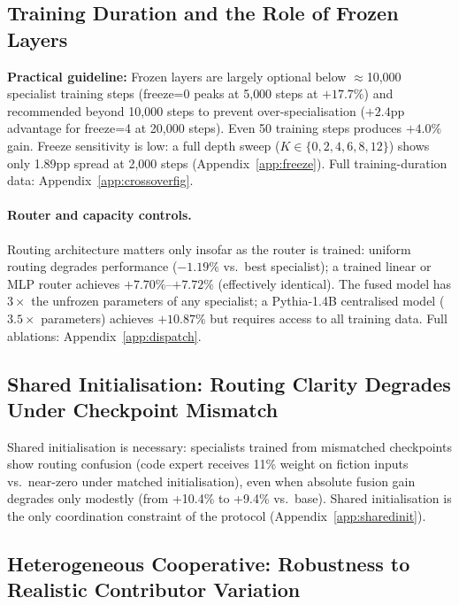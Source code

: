 \documentclass{article}
\begin{document}
\subsection{Training Duration and the Role of Frozen Layers}
\label{sec:crossover}

\textbf{Practical guideline:} Frozen layers are largely optional below $\approx$10{,}000 specialist training steps (freeze=0 peaks at 5{,}000 steps at $+17.7\%$) and recommended beyond 10{,}000 steps to prevent over-specialisation ($+2.4$pp advantage for freeze=4 at 20{,}000 steps). Even 50 training steps produces $+4.0\%$ gain. Freeze sensitivity is low: a full depth sweep ($K \in \{0,2,4,6,8,12\}$) shows only 1.89pp spread at 2{,}000 steps (Appendix~\ref{app:freeze}). Full training-duration data: Appendix~\ref{app:crossoverfig}.


\paragraph{Router and capacity controls.} Routing architecture matters only insofar as the router is trained: uniform routing degrades performance ($-1.19\%$ vs.\ best specialist); a trained linear or MLP router achieves $+7.70\%$--$+7.72\%$ (effectively identical). The fused model has $3\times$ the unfrozen parameters of any specialist; a Pythia-1.4B centralised model ($3.5\times$ parameters) achieves $+10.87\%$ but requires access to all training data. Full ablations: Appendix~\ref{app:dispatch}.

\subsection{Shared Initialisation: Routing Clarity Degrades Under Checkpoint Mismatch}
\label{sec:sharedinit}

Shared initialisation is necessary: specialists trained from mismatched checkpoints show routing confusion (code expert receives 11\% weight on fiction inputs vs.\ near-zero under matched initialisation), even when absolute fusion gain degrades only modestly (from +10.4\% to +9.4\% vs.\ base). Shared initialisation is the only coordination constraint of the protocol (Appendix~\ref{app:sharedinit}).

\subsection{Heterogeneous Cooperative: Robustness to Realistic Contributor Variation}
\label{sec:heterogeneous}
\end{document}
